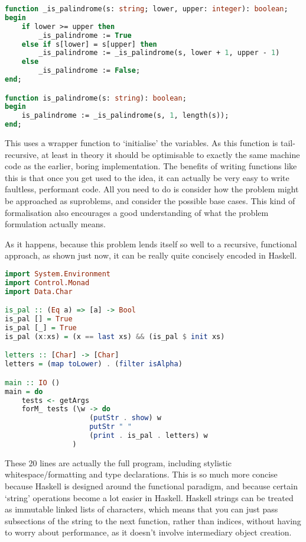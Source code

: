 \documentclass{article}
\begin{document}
\begin{lstlisting}[language=Pascal, caption=Recursive palindrome function in Pascal]
function _is_palindrome(s: string; lower, upper: integer): boolean;
begin
    if lower >= upper then
        _is_palindrome := True
    else if s[lower] = s[upper] then
        _is_palindrome := _is_palindrome(s, lower + 1, upper - 1)
    else
        _is_palindrome := False;
end;

function is_palindrome(s: string): boolean;
begin
    is_palindrome := _is_palindrome(s, 1, length(s));
end;
\end{lstlisting}

    This uses a wrapper function to `initialise' the variables. As this
    function is tail-recursive, at least in theory it should be optimisable to
    exactly the same machine code as the earlier, boring implementation. The
    benefits of writing functions like this is that once you get used to the
    idea, it can actually be very easy to write faultless, performant code. All
    you need to do is consider how the problem might be approached as
    suproblems, and consider the possible base cases. This kind of
    formalisation also encourages a good understanding of what the problem
    formulation actually means.

    As it happens, because this problem lends itself so well to a recursive,
    functional approach, as shown just now, it can be really quite concisely
    encoded in Haskell.

\begin{lstlisting}[language=Haskell, caption=Palindrome function in Haskell]
import System.Environment
import Control.Monad
import Data.Char

is_pal :: (Eq a) => [a] -> Bool
is_pal [] = True
is_pal [_] = True
is_pal (x:xs) = (x == last xs) && (is_pal $ init xs)

letters :: [Char] -> [Char]
letters = (map toLower) . (filter isAlpha)

main :: IO ()
main = do
    tests <- getArgs
    forM_ tests (\w -> do
                    (putStr . show) w
                    putStr " "
                    (print . is_pal . letters) w
                )
\end{lstlisting}

\iffalse $ \fi %

    These 20 lines are actually the full program, including stylistic
    whitespace/formatting and type declarations. This is so much more concise
    because Haskell is designed around the functional paradigm, and because
    certain `string' operations become a lot easier in Haskell. Haskell strings
    can be treated as immutable linked lists of characters, which means that
    you can just pass subsections of the string to the next function, rather
    than indices, without having to worry about performance, as it doesn't
    involve intermediary object creation.
\end{document}
